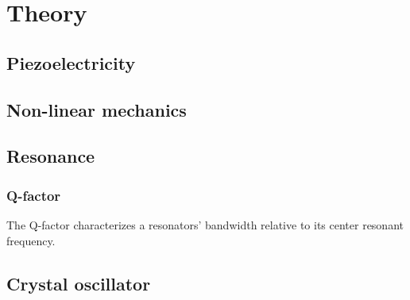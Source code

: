 
\section{Theory}


\subsection{Piezoelectricity}


\subsection{Non-linear mechanics}


\subsection{Resonance}


\subsubsection{Q-factor}
The Q-factor characterizes a resonators' bandwidth relative to its center resonant frequency.\cite{electroniccircuits} 

\subsection{Crystal oscillator}
